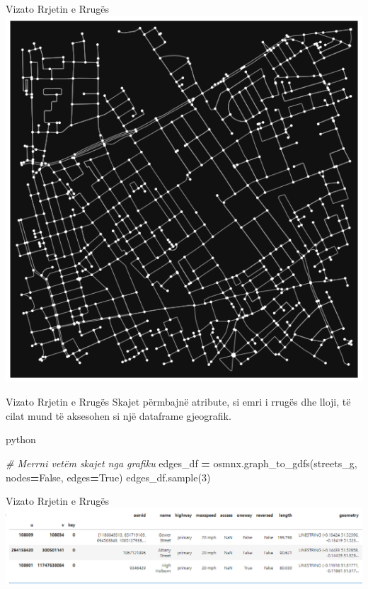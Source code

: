 \documentclass[
  ignorenonframetext,
]{beamer}
\newenvironment{Shaded}{\begin{snugshade}}{\end{snugshade}}
\newcommand{\CommentTok}[1]{\textcolor[rgb]{0.56,0.35,0.01}{\textit{#1}}}
\newcommand{\DecValTok}[1]{\textcolor[rgb]{0.00,0.00,0.81}{#1}}
\newcommand{\NormalTok}[1]{#1}
\newcommand{\OperatorTok}[1]{\textcolor[rgb]{0.81,0.36,0.00}{\textbf{#1}}}
\newcommand{\VariableTok}[1]{\textcolor[rgb]{0.00,0.00,0.00}{#1}}
\begin{document}
\begin{frame}{Vizato Rrjetin e Rrugës}
\protect\hypertarget{vizato-rrjetin-e-rruguxebs-3}{}
\includegraphics{./Figs/osmx1.png}
\end{frame}

\begin{frame}[fragile]{Vizato Rrjetin e Rrugës}
\protect\hypertarget{vizato-rrjetin-e-rruguxebs-4}{}
Skajet përmbajnë atribute, si emri i rrugës dhe lloji, të cilat mund të
aksesohen si një dataframe gjeografik.

python

\begin{Shaded}
\begin{Highlighting}[]
\CommentTok{\# Merrni vetëm skajet nga grafiku}
\NormalTok{edges\_df }\OperatorTok{=}\NormalTok{ osmnx.graph\_to\_gdfs(streets\_g, nodes}\OperatorTok{=}\VariableTok{False}\NormalTok{, edges}\OperatorTok{=}\VariableTok{True}\NormalTok{)}
\NormalTok{edges\_df.sample(}\DecValTok{3}\NormalTok{)}
\end{Highlighting}
\end{Shaded}
\end{frame}

\begin{frame}{Vizato Rrjetin e Rrugës}
\protect\hypertarget{vizato-rrjetin-e-rruguxebs-5}{}
\includegraphics{./Figs/rrjetirrugor.png}
\end{frame}
\end{document}
